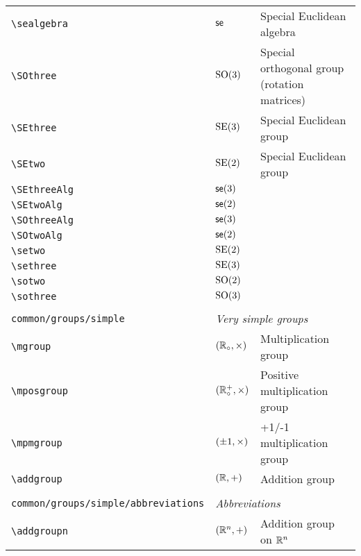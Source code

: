 \begin{longtable}{lll}
 {\color[rgb]{0.5,0.5,0.5}\texttt{\textbackslash sealgebra}} & $\mathsf{se}$ &  Special Euclidean algebra\\ 
 {\color[rgb]{0.5,0.5,0.5}\texttt{\textbackslash SOthree}} & $\mathrm{SO(3)}$ &  Special orthogonal group (rotation matrices)\\ 
 {\color[rgb]{0.5,0.5,0.5}\texttt{\textbackslash SEthree}} & $\mathrm{SE(3)}$ &  Special Euclidean group \\ 
 {\color[rgb]{0.5,0.5,0.5}\texttt{\textbackslash SEtwo}} & $\mathrm{SE(2)}$ &  Special Euclidean group \\ 
 {\color[rgb]{0.5,0.5,0.5}\texttt{\textbackslash SEthreeAlg}} & $\mathsf{se}(3)$ & \\ 
 {\color[rgb]{0.5,0.5,0.5}\texttt{\textbackslash SEtwoAlg}} & $\mathsf{se}(2)$ & \\ 
 {\color[rgb]{0.5,0.5,0.5}\texttt{\textbackslash SOthreeAlg}} & $\mathsf{se}(3)$ & \\ 
 {\color[rgb]{0.5,0.5,0.5}\texttt{\textbackslash SOtwoAlg}} & $\mathsf{se}(2)$ & \\ 
 {\color[rgb]{0.5,0.5,0.5}\texttt{\textbackslash setwo}} & $\mathrm{SE(2)}$ & \\ 
 {\color[rgb]{0.5,0.5,0.5}\texttt{\textbackslash sethree}} & $\mathrm{SE(3)}$ & \\ 
 {\color[rgb]{0.5,0.5,0.5}\texttt{\textbackslash sotwo}} & $\mathrm{SO}(2)$ & \\ 
 {\color[rgb]{0.5,0.5,0.5}\texttt{\textbackslash sothree}} & $\mathrm{SO(3)}$ & \\ 
  &  & \\ 
 {\color[rgb]{0.5,0.5,0.5}\texttt{common/groups/simple}} & \multicolumn{2}{l}{\emph{Very simple groups}}\\ 
 \hline
{\color[rgb]{0.5,0.5,0.5}\texttt{\textbackslash mgroup}} & $(\mathbb{R}_{\circ},\times)$ &  Multiplication group\\ 
 {\color[rgb]{0.5,0.5,0.5}\texttt{\textbackslash mposgroup}} & $(\mathbb{R}^{+}_{\circ},\times)$ &  Positive multiplication group\\ 
 {\color[rgb]{0.5,0.5,0.5}\texttt{\textbackslash mpmgroup}} & $(\pm1,\times)$ &  +1/-1 multiplication group\\ 
 {\color[rgb]{0.5,0.5,0.5}\texttt{\textbackslash addgroup}} & $(\mathbb{R},+)$ &  Addition group\\ 
  &  & \\ 
 {\color[rgb]{0.5,0.5,0.5}\texttt{common/groups/simple/abbreviations}} & \multicolumn{2}{l}{\emph{Abbreviations}}\\ 
 \hline
{\color[rgb]{0.5,0.5,0.5}\texttt{\textbackslash addgroupn}} & $(\mathbb{R}^n,+)$ &  Addition group on $\mathbb{R}^n$\\ 

\end{longtable}
